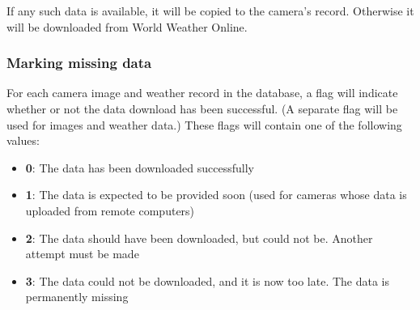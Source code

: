 \documentclass[11pt]{article}
\begin{document}
If any such data is available, it will be copied to the camera's record. Otherwise it will be downloaded from World Weather Online.

\subsubsection{Marking missing data}
For each camera image and weather record in the database, a flag will indicate whether or not the data download has been successful. (A separate flag will be used for images and weather data.) These flags will contain one of the following values:

\begin{itemize}
\item \textbf{0}: The data has been downloaded successfully
\item \textbf{1}: The data is expected to be provided soon (used for cameras whose data is uploaded from remote computers)
\item \textbf{2}: The data should have been downloaded, but could not be. Another attempt must be made
\item \textbf{3}: The data could not be downloaded, and it is now too late. The data is permanently missing
\end{itemize}
\end{document}
